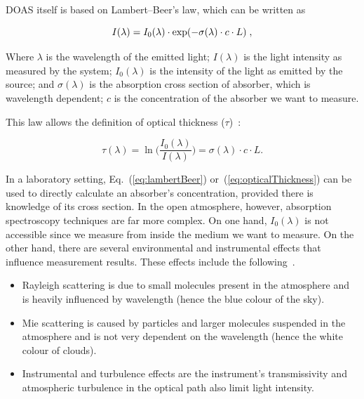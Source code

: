 DOAS itself is based on Lambert--Beer's law, which can be written as
\cite{Platt2007}

\begin{equation}
  \centering
  \label{eq:lambertBeer}
  I(\lambda) = I_0 (\lambda) \cdot \exp(-\sigma(\lambda) \cdot c \cdot L) \;,
\end{equation}

Where $\lambda$ is the wavelength of the emitted light; $I(\lambda)$ is
the light intensity as measured by the system; $I_{0}(\lambda)$ is the
intensity of the light as emitted by the source; and $\sigma(\lambda)$
is the absorption cross section of absorber, which is wavelength
dependent; $c$ is the concentration of the absorber we want to measure.


This law allows the definition of optical thickness
($\tau$)~\cite{Platt2007}:

\begin{equation}
      \label{eq:opticalThickness}
      \tau(\lambda) = \ln \bigg( \frac{I_{0}(\lambda)}{I(\lambda)}\bigg) = \sigma(\lambda) \cdot c \cdot
      L.
\end{equation}

In a laboratory setting, Eq.~(\ref{eq:lambertBeer})
or~(\ref{eq:opticalThickness}) can be used to directly calculate an
absorber's concentration, provided there is knowledge of  its cross
section. In the open atmosphere, however, absorption spectroscopy
techniques are far more complex. On one hand, $I_0(\lambda)$ is not
accessible since we measure from inside the medium we want to measure.
On the other hand, there are several environmental and instrumental
effects that influence measurement results. These effects include the
following~\cite{Platt2007}.

\begin{itemize}
      \item Rayleigh scattering is due to small molecules present in the
          atmosphere and is heavily influenced by wavelength (hence the
          blue colour of the
      sky).
      \item Mie scattering is caused by particles and larger molecules
          suspended in the atmosphere and is not very dependent
      on the wavelength (hence the white colour of clouds).
      \item Instrumental and turbulence effects are the instrument's
          transmissivity and atmospheric turbulence in the optical path
          also limit light intensity.

  \end{itemize}

